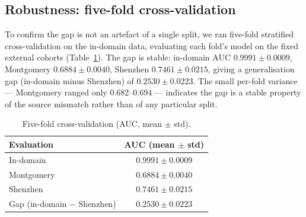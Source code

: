 \documentclass{article}
\begin{document}
\subsection{Robustness: five-fold cross-validation}
To confirm the gap is not an artefact of a single split, we ran five-fold stratified
cross-validation on the in-domain data, evaluating each fold's model on the fixed external cohorts
(Table~\ref{tab:cv}). The gap is stable: in-domain AUC $0.9991 \pm 0.0009$, Montgomery
$0.6884 \pm 0.0040$, Shenzhen $0.7461 \pm 0.0215$, giving a generalisation gap (in-domain minus
Shenzhen) of $0.2530 \pm 0.0223$. The small per-fold variance --- Montgomery ranged only
0.682--0.694 --- indicates the gap is a stable property of the source mismatch rather than of any
particular split.

\begin{table}[t]
\caption{Five-fold cross-validation (AUC, mean $\pm$ std).}
\label{tab:cv}
\centering
\begin{tabular}{lc}
\toprule
Evaluation & AUC (mean $\pm$ std) \\
\midrule
In-domain & $0.9991 \pm 0.0009$ \\
Montgomery & $0.6884 \pm 0.0040$ \\
Shenzhen & $0.7461 \pm 0.0215$ \\
Gap (in-domain $-$ Shenzhen) & $0.2530 \pm 0.0223$ \\
\bottomrule
\end{tabular}
\end{table}
\end{document}
